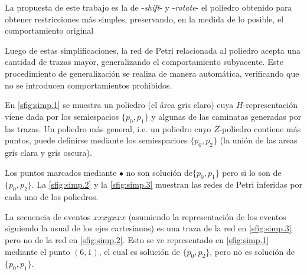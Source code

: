 La propuesta de este trabajo es la de  -\textit{shift}- y  -\textit{rotate}- el poliedro obtenido 
para obtener restricciones más simples, preservando, en la medida de lo posible, el comportamiento
original

Luego de estas simplificaciones, la red de Petri relacionada al poliedro acepta
una cantidad de trazas mayor, generalizando el comportamiento subyacente. Este procedimiento
de generalización se realiza de manera automática, verificando que no se introducen comportamientos
prohibidos.

\begin{example} 
    \label{ex:polyhedra}
    En \autoref{sfig:simp.1} se muestra un poliedro (el área gris claro) cuya $H$-representación viene
    dada por los semiespacios $\{p_0,p_1\}$ y algunas de las caminatas generadas por las trazas.
    Un poliedro más general, i.e. un poliedro cuyo $Z$-poliedro contiene más puntos, puede definirse
    mediante los semiespacioes $\{p_0,p_2\}$ (la unión de las areas gris clara y gris oscura). 
    
    Los puntos marcados mediante $\bullet$ no son solución de$\{p_0,p_1\}$ pero si lo son de $\{p_0,p_2\}$.
    La \autoref{sfig:simp.2} y la \autoref{sfig:simp.3} muestran las redes de Petri inferidas por cada uno 
    de los poliedros. 

    La secuencia de eventos $xxxyxxx$ (asumiendo la representación de los eventos siguiendo la usual de los 
    ejes cartesianos) es una traza de la red en \autoref{sfig:simp.3} pero no de la red en \autoref{sfig:simp.2}.
    Esto se ve representado en \autoref{sfig:simp.1} mediante el punto $(6,1)$, el cual es solución de $\{p_0,p_2\}$,
    pero no es solución de $\{p_0,p_1\}$.
\end{example}


